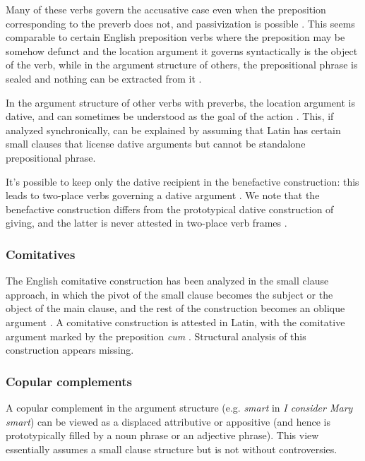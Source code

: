 \documentclass[a4paper, oneside, 12pt]{report}
\newcommand*{\citesec}[1]{\S~{#1}}
\newcommand{\form}[1]{\emph{#1}}
\begin{document}
Many of these verbs govern the accusative case even when the preposition corresponding to the preverb does not,
and passivization is possible
\citep[\citesec{4.22}]{Pinkster1}.
This seems comparable to certain English preposition verbs 
where the preposition may be somehow defunct
and the location argument it governs syntactically is the object of the verb,
while in the argument structure of others, the prepositional phrase is sealed and nothing can be extracted from it \citep{richards2017multiple}.

In the argument structure of other verbs with preverbs, the location argument is dative,
and can sometimes be understood as the goal of the action
\citep[\citesec{4.25}, \citesec{12.7}]{Pinkster1}.
This, if analyzed synchronically, can be explained by assuming that 
Latin has certain small clauses that license dative arguments but cannot be standalone  prepositional phrase.

It's possible to keep only the dative recipient in the benefactive construction:
this leads to two-place verbs governing a dative argument 
\citep[\citesec{4.24}]{Pinkster1}. 
We note that the benefactive construction differs from 
the prototypical dative construction of giving,
and the latter is never attested in two-place verb frames
\citep[\citesec{12.7}]{Pinkster1}.


\subsubsection{Comitatives}
\label{sec:grammatical.clause.core.comitative}

The English comitative construction has been analyzed in the small clause approach,
in which the pivot of the small clause becomes the subject or the object of the main clause,
and the rest of the construction becomes an oblique argument \citep{zhang2007syntax}.
A comitative construction is attested in Latin, with the comitative argument marked by the preposition \form{cum} \citep[\citesec{4.38}]{Pinkster1}.
Structural analysis of this construction appears missing.

\subsubsection{Copular complements}

A copular complement in the argument structure (e.g. \form{smart} in \form{I consider Mary smart}) can be viewed as a displaced attributive or appositive (and hence is prototypically filled by a noun phrase or an adjective phrase).
This view essentially assumes a small clause structure \citep{bowers1993syntax}
but is not without controversies.
\end{document}
